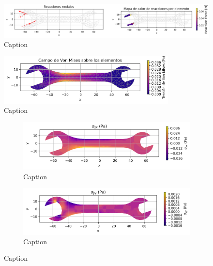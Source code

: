\documentclass{article}  %
\begin{document}
\begin{figure}
  \centering
  \includegraphics[width=1\textwidth]{GRAFICOS/Case d_deformada_reacciones.png}
  \caption{Caption}
  \label{fig:principal}
\end{figure}

\begin{figure}
  \centering
  \includegraphics[width=0.8\textwidth]{GRAFICOS/Case d_von_mises.png}
  \caption{Caption}
  \label{fig:principal}
\end{figure}

\begin{figure}
  \centering
  \begin{subfigure}[t]{0.49\textwidth}
    \centering
    \includegraphics[width=\textwidth]{GRAFICOS/Case d - sigma_xx.png}
    \caption{Caption}
    \label{fig:deformada_reacciones}
  \end{subfigure}
  \hfill
  \begin{subfigure}[t]{0.49\textwidth}
    \centering
    \includegraphics[width=\textwidth]{GRAFICOS/Case d - sigma_yy.png}
    \caption{Caption}
    \label{fig:von_mises}
  \end{subfigure}
  \caption{Caption}
  \label{fig:analisis_estructural}
\end{figure}
\end{document}
